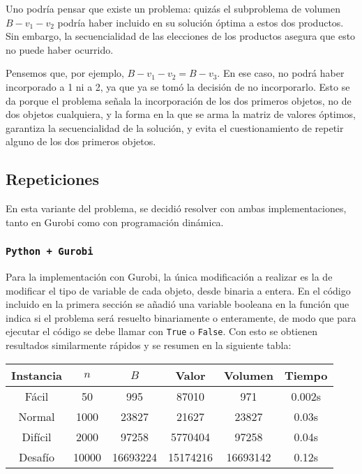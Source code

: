 \documentclass[letterpaper,10pt]{article}
\begin{document}
  Uno podría pensar que existe un problema: quizás el subproblema de volumen $B - v_{1} - v_{2}$ podría haber incluido en su solución óptima a estos dos productos. Sin embargo, la secuencialidad de las elecciones de los productos asegura que esto no puede haber ocurrido.

  Pensemos que, por ejemplo, $B - v_{1} - v_{2} = B - v_{3}$. En ese caso, no podrá haber incorporado a 1 ni a 2, ya que ya se tomó la decisión de no incorporarlo. Esto se da porque el problema señala la incorporación de los dos primeros objetos, no de dos objetos cualquiera, y la forma en la que se arma la matriz de valores óptimos, garantiza la secuencialidad de la solución, y evita el cuestionamiento de repetir alguno de los dos primeros objetos.

  \subsection{Repeticiones}
  
  En esta variante del problema, se decidió resolver con ambas implementaciones, tanto en Gurobi como con programación dinámica.

  \subsubsection{\texttt{Python + Gurobi}}
  
  Para la implementación con Gurobi, la única modificación a realizar es la de modificar el tipo de variable de cada objeto, desde binaria a entera. En el código incluido en la primera sección se añadió una variable booleana en la función que indica si el problema será resuelto binariamente o enteramente, de modo que para ejecutar el código se debe llamar con \texttt{True} o \texttt{False}. Con esto se obtienen resultados similarmente rápidos y se resumen en la siguiente tabla:
  
  \begin{center}
    \begin{tabular}{c|c|c|c|c|c}
      Instancia & $n$ & $B$ & Valor & Volumen & Tiempo\\\hline
      Fácil & 50 & 995 & 87010 & 971 & 0.002s\\
      Normal & 1000 & 23827 & 21627 & 23827 & 0.03s\\
      Difícil & 2000 & 97258 & 5770404 & 97258 & 0.04s\\
      Desafío & 10000 & 16693224 & 15174216 & 16693142 & 0.12s\\
    \end{tabular}
  \end{center}
\end{document}
